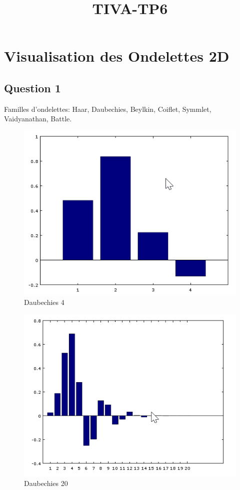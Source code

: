 \documentclass{report}
\title{TIVA-TP6}
\begin{document}
\maketitle
\section*{Visualisation des Ondelettes 2D}
\subsection*{Question 1}
Familles d'ondelettes: Haar, Daubechies, Beylkin, Coiflet, Symmlet, Vaidyanathan, Battle.
\begin{figure}[H]
\begin{center}
\includegraphics{Daubechies4.png}
\end{center}
\caption{Daubechies 4}
\end{figure}

\begin{figure}[H]
\begin{center}
\includegraphics{Daubechies20.png}
\end{center}
\caption{Daubechies 20}
\end{figure}
\end{document}

